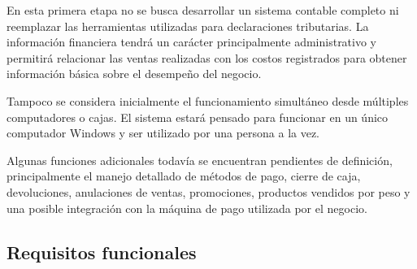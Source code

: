 \documentclass[10pt,a4paper]{article}
\begin{document}
\begin{itemize}
En esta primera etapa no se busca desarrollar un sistema contable completo ni reemplazar las herramientas utilizadas para declaraciones tributarias. La información financiera tendrá un carácter principalmente administrativo y permitirá relacionar las ventas realizadas con los costos registrados para obtener información básica sobre el desempeño del negocio.

Tampoco se considera inicialmente el funcionamiento simultáneo desde múltiples computadores o cajas. El sistema estará pensado para funcionar en un único computador Windows y ser utilizado por una persona a la vez.

Algunas funciones adicionales todavía se encuentran pendientes de definición, principalmente el manejo detallado de métodos de pago, cierre de caja, devoluciones, anulaciones de ventas, promociones, productos vendidos por peso y una posible integración con la máquina de pago utilizada por el negocio.

\end{itemize}
\subsection{Requisitos funcionales}
\end{document}

